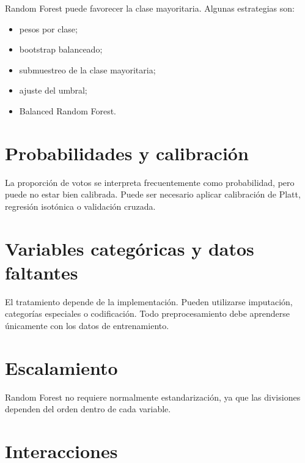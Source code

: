 \documentclass[
  spanish,
  10.5pt,
  letterpaper,
  DIV=11,
  numbers=noendperiod,
  oneside,
  open=any]{scrreprt}
\providecommand{\tightlist}{%
  \setlength{\itemsep}{0pt}\setlength{\parskip}{0pt}}
\theoremstyle{definition}
\theoremstyle{definition}
\theoremstyle{plain}
\theoremstyle{remark}
\begin{document}

Random Forest puede favorecer la clase mayoritaria. Algunas estrategias
son:

\begin{itemize}
\tightlist
\item
  pesos por clase;
\item
  bootstrap balanceado;
\item
  submuestreo de la clase mayoritaria;
\item
  ajuste del umbral;
\item
  Balanced Random Forest.
\end{itemize}

\section*{Probabilidades y
calibración}\label{probabilidades-y-calibraciuxf3n}


La proporción de votos se interpreta frecuentemente como probabilidad,
pero puede no estar bien calibrada. Puede ser necesario aplicar
calibración de Platt, regresión isotónica o validación cruzada.

\section*{Variables categóricas y datos
faltantes}\label{variables-categuxf3ricas-y-datos-faltantes}


El tratamiento depende de la implementación. Pueden utilizarse
imputación, categorías especiales o codificación. Todo preprocesamiento
debe aprenderse únicamente con los datos de entrenamiento.

\section*{Escalamiento}\label{escalamiento-1}


Random Forest no requiere normalmente estandarización, ya que las
divisiones dependen del orden dentro de cada variable.

\section*{Interacciones}\label{interacciones-2}
\end{document}
